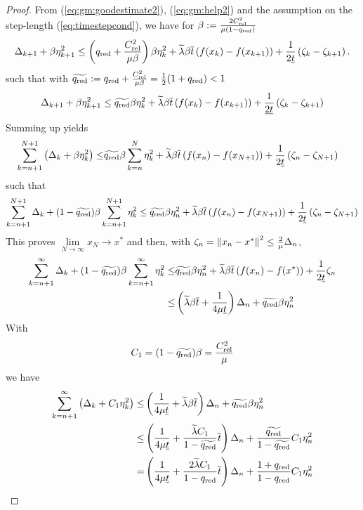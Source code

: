 \begin{proof}
From  (\ref{eq:gm:goodestimate2}), (\ref{eq:gm:help2}) and the assumption on the step-length (\ref{eq:timestepcond}),  we have  for $\beta:=\frac{2C_{\rm rel}^2}{\mu(1-q_{\rm red})}$ 
%
\begin{align*}
\Delta_{k+1} + \beta\eta^2_{k+1} \le  \left(q_{\rm red} + \frac{C_{\rm rel}^2}{\mu \beta}\right) \beta\eta^2_{k} 
+ \widetilde{\lambda}\beta \overline{t} \left(f(x_{k})-f(x_{k+1})\right) + \frac{1}{2\underline{t}}\left(\zeta_k - \zeta_{k+1}\right).
\end{align*}
%
such that with $\widetilde{q_{\rm red}}:= q_{\rm red} + \frac{C_{\rm rel}^2}{\mu \beta} = \frac12(1+q_{\rm red})<1$
%
\begin{align*}
\Delta_{k+1} + \beta\eta^2_{k+1} \le
\widetilde{q_{\rm red}} \beta\eta^2_{k}
+ \widetilde{\lambda}\beta \overline{t} \left(f(x_{k})-f(x_{k+1})\right)
+ \frac{1}{\underline{2t}}\left(\zeta_k - \zeta_{k+1}\right)
\end{align*}
%
Summing up  yields
%
\begin{align*}
\sum_{k=n+1}^{N+1}\left(\Delta_{k} + \beta\eta^2_{k}\right)
\le& 
\widetilde{q_{\rm red}}\beta\sum_{k=n}^{N}\eta^2_k
+ \widetilde{\lambda}\beta \overline{t} \left(f(x_{n})-f(x_{N+1})\right)
+ \frac{1}{2\underline{t}}\left(\zeta_n - \zeta_{N+1}\right) 
\end{align*}
%
such that
%
\begin{align*}
\sum_{k=n+1}^{N+1}\Delta_{k} + (1-\widetilde{q_{\rm red}})\beta\sum_{k=n+1}^{N+1}\eta^2_k
\le 
\widetilde{q_{\rm red}}\beta\eta^2_n
+  \widetilde{\lambda}\beta \overline{t} \left(f(x_{n})-f(x_{N+1})\right)
+ \frac{1}{2\underline{t}}\left(\zeta_n - \zeta_{N+1}\right) 
\end{align*}
%
This proves $\lim\limits_{N\to\infty}x_N \to x^*$ and then, with $\zeta_n=\left\|x_n-x^*\right\|^2 \le \frac{2}{\mu} \Delta_n$,
%
\begin{align*}
\sum_{k=n+1}^{\infty}\Delta_{k} + (1-\widetilde{q_{\rm red}})\beta\sum_{k=n+1}^{\infty}\eta^2_k
\le &
\widetilde{q_{\rm red}}\beta\eta^2_n
+  \widetilde{\lambda}\beta \overline{t} \left(f(x_{n})-f(x^*)\right)
+ \frac{1}{2\underline{t}}\zeta_n\\
\le & 
\left( \widetilde{\lambda}\beta \overline{t}+ \frac{1}{4\mu\underline{t}}\right) \Delta_{n} + \widetilde{q_{\rm red}}\beta\eta^2_n
\end{align*}
%
With
%
\begin{align*}
C_1 = (1-\widetilde{q_{\rm red}})\beta = \frac{C_{\rm rel}^2}{\mu}
\end{align*}
%
we have
%
\begin{align*}
\sum_{k=n+1}^{\infty}\left( \Delta_{k} + C_1\eta^2_k\right)
\le&
\left( \frac{1}{4\mu\underline{t}}+  \widetilde{\lambda}\beta \overline{t}\right) \Delta_{n} + \widetilde{q_{\rm red}}\beta\eta^2_n\\
\le&\left( \frac{1}{4\mu\underline{t}}+  \frac{\widetilde{\lambda}C_1}{1-\widetilde{q_{\rm red}}} \overline{t}\right) \Delta_{n} + \frac{\widetilde{q_{\rm red}}}{1-\widetilde{q_{\rm red}}}C_1\eta^2_n\\
=&\left( \frac{1}{4\mu\underline{t}}+  \frac{2\widetilde{\lambda}C_1}{1-{q_{\rm red}}} \overline{t}\right) \Delta_{n} + \frac{1+{q_{\rm red}}}{1-{q_{\rm red}}}C_1\eta^2_n
\end{align*}
%
%
\end{proof}
%


